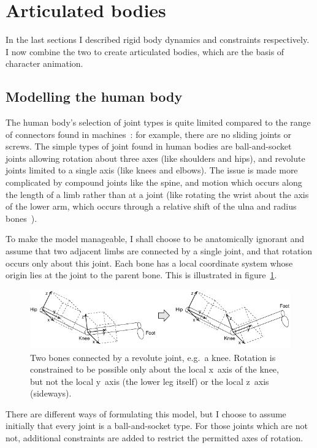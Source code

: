 \section{Articulated bodies\label{articulatedBodies}}

In the last sections I described rigid body dynamics and constraints respectively. I now combine
the two to create articulated bodies, which are the basis of character animation.

\subsection{Modelling the human body}

The human body's selection of joint types is quite limited compared to the range of connectors
found in machines~\cite{Kalra:95}: for example, there are no sliding joints or screws. The simple
types of joint found in human bodies are ball-and-socket joints allowing rotation about three axes
(like shoulders and hips), and revolute joints limited to a single axis (like knees and elbows).
The issue is made more complicated by compound joints like the spine, and motion which occurs
along the length of a limb rather than at a joint (like rotating the wrist about the axis of
the lower arm, which occurs through a relative shift of the ulna and radius
bones~\cite{Anatomy:03}).

To make the model manageable, I shall choose to be anatomically ignorant and assume that two
adjacent limbs are connected by a single joint, and that rotation occurs only about this joint.
Each bone has a local coordinate system whose origin lies at the joint to the parent bone.
This is illustrated in figure~\ref{jointsFigure}.

\begin{figure}
\centerline{\includegraphics{figures/joint1}}
\caption{Two bones connected by a revolute joint, e.g.\ a knee. Rotation is constrained to be
    possible only about the local x~axis of the knee, but not the local y~axis
    (the lower leg itself) or the local z~axis (sideways).\label{jointsFigure}}
\end{figure}

There are different ways of formulating this model, but I choose to assume initially that every
joint is a ball-and-socket type. For those joints which are not not, additional constraints are
added to restrict the permitted axes of rotation.

